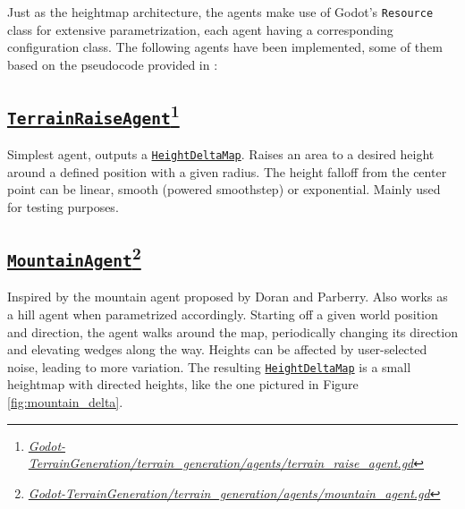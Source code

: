 Just as the heightmap architecture, the agents make use of Godot's \texttt{Resource} class for extensive parametrization, each agent having a corresponding configuration class.
The following agents have been implemented, some of them based on the pseudocode provided in \cite{Doran:2010:CPT}:

\subsection[\texttt{TerrainRaiseAgent}]{\href{https://github.com/fsande/TFG---Eric-Rios/blob/main/Godot-TerrainGeneration/terrain_generation/agents/terrain_raise_agent.gd}{\texttt{TerrainRaiseAgent}}\footnote{\href{https://github.com/fsande/TFG---Eric-Rios/blob/main/Godot-TerrainGeneration/terrain_generation/agents/terrain_raise_agent.gd}{\textit{Godot-TerrainGeneration/terrain\_generation/agents/terrain\_raise\_agent.gd}}}}

Simplest agent, outputs a \href{https://github.com/fsande/TFG---Eric-Rios/blob/main/Godot-TerrainGeneration/terrain_generation/core/height_delta_map.gd}{\texttt{HeightDeltaMap}}.
Raises an area to a desired height around a defined position with a given radius.
The height falloff from the center point can be linear, smooth (powered smoothstep) or exponential.
Mainly used for testing purposes.

\subsection[\texttt{MountainAgent}]{\href{https://github.com/fsande/TFG---Eric-Rios/blob/main/Godot-TerrainGeneration/terrain_generation/agents/mountain_agent.gd}{\texttt{MountainAgent}}\footnote{\href{https://github.com/fsande/TFG---Eric-Rios/blob/main/Godot-TerrainGeneration/terrain_generation/agents/mountain_agent.gd}{\textit{Godot-TerrainGeneration/terrain\_generation/agents/mountain\_agent.gd}}}}

Inspired by the mountain agent proposed by Doran and Parberry. 
Also works as a hill agent when parametrized accordingly.
Starting off a given world position and direction, the agent walks around the map, periodically changing its direction and elevating wedges along the way.
Heights can be affected by user-selected noise, leading to more variation.
The resulting \href{https://github.com/fsande/TFG---Eric-Rios/blob/main/Godot-TerrainGeneration/terrain_generation/core/height_delta_map.gd}{\texttt{HeightDeltaMap}} is a small heightmap with directed heights, like the one pictured in Figure \ref{fig:mountain_delta}.

